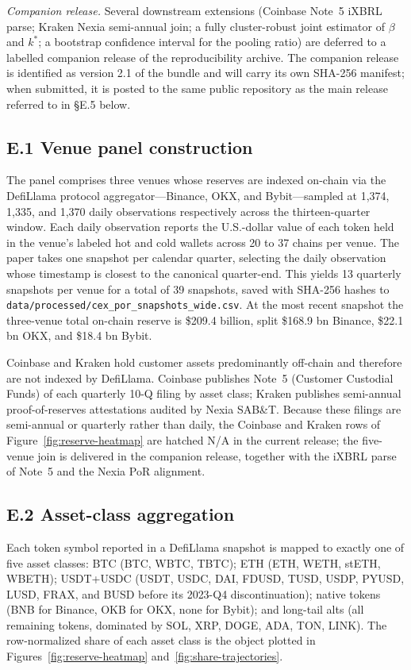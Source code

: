\documentclass[12pt]{article}
\theoremstyle{sampledef}
\theoremstyle{sampleplain}
\theoremstyle{sampleremark}
\newcommand{\1}{\mathbf{1}}
\begin{document}
\textit{Companion release.} Several downstream extensions
(Coinbase Note~5 iXBRL parse; Kraken Nexia semi-annual join; a
fully cluster-robust joint estimator of $\beta$ and $k^\ast$; a
bootstrap confidence interval for the pooling ratio) are deferred
to a labelled companion release of the reproducibility archive.
The companion release is identified as version 2.1 of the bundle
and will carry its own SHA-256 manifest; when submitted, it is
posted to the same public repository as the main release referred
to in \S E.5 below.

\subsection*{E.1 Venue panel construction}

The panel comprises three venues whose reserves are indexed
on-chain via the DefiLlama protocol aggregator---Binance, OKX, and
Bybit---sampled at 1,374, 1,335, and 1,370 daily observations
respectively across the thirteen-quarter window. Each daily
observation reports the U.S.-dollar value of each token held in
the venue's labeled hot and cold wallets across 20 to 37 chains
per venue. The paper takes one snapshot per calendar quarter,
selecting the daily observation whose timestamp is closest to the
canonical quarter-end. This yields 13 quarterly snapshots per
venue for a total of 39 snapshots, saved with SHA-256 hashes to
\texttt{data/processed/cex\_por\_snapshots\_wide.csv}. At the
most recent snapshot the three-venue total on-chain reserve is
\$209.4 billion, split \$168.9 bn Binance, \$22.1 bn OKX, and
\$18.4 bn Bybit.

Coinbase and Kraken hold customer assets predominantly off-chain
and therefore are not indexed by DefiLlama. Coinbase publishes
Note~5 (Customer Custodial Funds) of each quarterly 10-Q filing
by asset class; Kraken publishes semi-annual proof-of-reserves
attestations audited by Nexia SAB\&T. Because these filings are
semi-annual or quarterly rather than daily, the Coinbase and
Kraken rows of Figure~\ref{fig:reserve-heatmap} are hatched N/A in
the current release; the five-venue join is delivered in the
companion release, together with the iXBRL parse of Note~5 and
the Nexia PoR alignment.\label{app:four-venue}

\subsection*{E.2 Asset-class aggregation}

Each token symbol reported in a DefiLlama snapshot is mapped to
exactly one of five asset classes:
BTC (BTC, WBTC, TBTC);
ETH (ETH, WETH, stETH, WBETH);
USDT+USDC (USDT, USDC, DAI, FDUSD, TUSD, USDP, PYUSD, LUSD, FRAX,
and BUSD before its 2023-Q4 discontinuation);
native tokens (BNB for Binance, OKB for OKX, none for Bybit); and
long-tail alts (all remaining tokens, dominated by SOL, XRP, DOGE,
ADA, TON, LINK). The row-normalized share of each asset class is
the object plotted in Figures~\ref{fig:reserve-heatmap}
and~\ref{fig:share-trajectories}.
\end{document}
